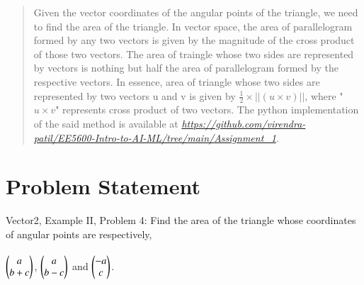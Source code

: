 \documentclass[journal,12pt]{IEEEtran}
\renewcommand\thesection{\arabic{section}}
\begin{document}
\renewcommand{\thetable}{\theenumi}
\begin{abstract}
Given the vector coordinates of the angular points of the triangle, we need to find the area of the triangle. In vector space, the area of parallelogram formed by any two vectors is given by the magnitude of the cross product of those two vectors. The area of traingle whose two sides are represented by vectors is nothing but half the area of parallelogram formed by the respective vectors. In essence, area of triangle whose two sides are represented by two vectors u and v is given by $\frac{1}{2} \times ||(u \times v)||$, where "$u \times v$" represents cross product of two vectors. The python implementation of the said method is available at  \href{https://github.com/virendra-patil/EE5600-Intro-to-AI-ML/tree/main/Assignment_1}{\emph{https://github.com/virendra-patil/EE5600-Intro-to-AI-ML/tree/main/Assignment\_1}}.
\end{abstract}
%
%

%
\section{Problem Statement}

Vector2, Example II, Problem 4: Find the area of the triangle whose coordinates of angular points are respectively,\\\\ $\begin{pmatrix}a\\b+c\end{pmatrix}$, $\begin{pmatrix}a\\b-c\end{pmatrix}$ and $\begin{pmatrix}-a\\c\end{pmatrix}$.

\end{document}
